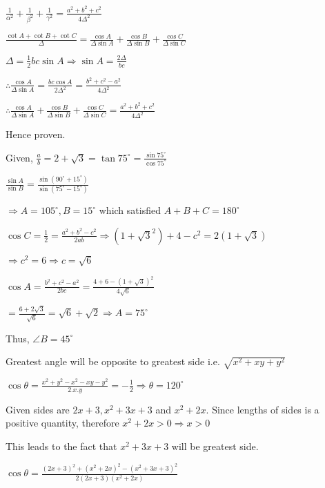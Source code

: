   $\frac{1}{\alpha^2} + \frac{1}{\beta^2} + \frac{1}{\gamma^2} = \frac{a^2 + b^2 + c^2}{4\Delta^2}$

  $\frac{\cot A + \cot B + \cot C}{\Delta} = \frac{\cos A}{\Delta\sin A} + \frac{\cos B}{\Delta\sin B} + \frac{\cos
  C}{\Delta\sin C}$

  $\Delta = \frac{1}{2}bc\sin A \Rightarrow \sin A = \frac{2\Delta}{bc}$

  $\therefore \frac{\cos A}{\Delta\sin A} = \frac{bc\cos A}{2\Delta^2} = \frac{b^2 + c^2 - a^2}{4\Delta^2}$

  $\therefore \frac{\cos A}{\Delta\sin A} + \frac{\cos B}{\Delta\sin B} + \frac{\cos
  C}{\Delta\sin C} = \frac{a^2 + b^2 + c^2}{4\Delta^2}$

  Hence proven.

\item Given, $\frac{a}{b} = 2 + \sqrt{3} = \tan75^\circ = \frac{\sin75^\circ}{\cos75^\circ}$

  $\frac{\sin A}{\sin B} = \frac{\sin(90^\circ + 15^\circ)}{\sin(75^\circ - 15^\circ)}$

  $\Rightarrow A = 105^\circ, B= 15^\circ$ which satisfied $A + B + C = 180^\circ$

\item $\cos C = \frac{1}{2} = \frac{a^2 + b^2 - c^2}{2ab} \Rightarrow (1 + \sqrt{3}^2) + 4 - c^2 = 2(1 + \sqrt{3})$

  $\Rightarrow c^2 = 6 \Rightarrow c = \sqrt{6}$

  $\cos A = \frac{b^2 + c^2 - a^2}{2bc} = \frac{4 + 6 - (1 + \sqrt{3})^2}{4\sqrt{6}}$

  $= \frac{6 + 2\sqrt{3}}{\sqrt{6}} = \sqrt{6} + \sqrt{2} \Rightarrow A = 75^\circ$

  Thus, $\angle B = 45^\circ$

\item Greatest angle will be opposite to greatest side i.e. $\sqrt{x^2 + xy + y^2}$

  $\cos\theta = \frac{x^2 + y^2 - x^2 - xy - y^2}{2.x.y} = -\frac{1}{2} \Rightarrow \theta = 120^\circ$

\item Given sides are $2x + 3, x^2 + 3x + 3$ and $x^2 + 2x.$ Since lengths of sides is a positive quantity, therefore
  $x^2 + 2x > 0 \Rightarrow x > 0$

  This leads to the fact that $x^2 + 3x + 3$ will be greatest side.

  $\cos\theta = \frac{(2x + 3)^2 + (x^2 + 2x)^2 - (x^2 + 3x + 3)^2}{2(2x + 3)(x^2 + 2x)}$

